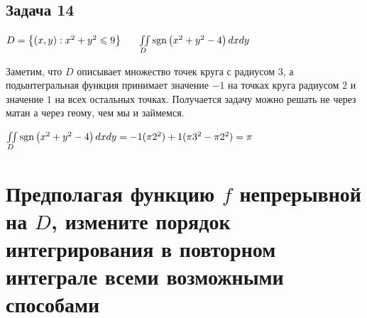 \documentclass[a4paper, fleqn]{article}
\begin{document}
    \subsection*{Задача 14}
    $D = \left\{ (x, y): x^2 + y^2 \leqslant 9 \right\} \;\;\;\;\;\; \iint \limits_D \operatorname{\mathop{\mathrm{sgn}}} \left( x^2 + y^2 - 4 \right) dx dy$ 

    Заметим, что $D$ описывает множество точек круга с радиусом $3$, а подынтегральная функция принимает значение 
    $-1$ на точках круга радиусом $2$ и значение $1$ на всех остальных точках. 
    Получается задачу можно решать не через матан а через геому, чем мы и займемся.

    $\iint \limits_D \operatorname{\mathop{\mathrm{sgn}}} \left( x^2 + y^2 - 4 \right) dx dy = - 1 (\pi 2^2) + 1 (\pi 3^2 - \pi 2^2) = \pi$

    
    
    \section*{Предполагая функцию $f$ непрерывной на $D$, измените порядок интегрирования в повторном интеграле
    всеми возможными способами}
    
\end{document}
